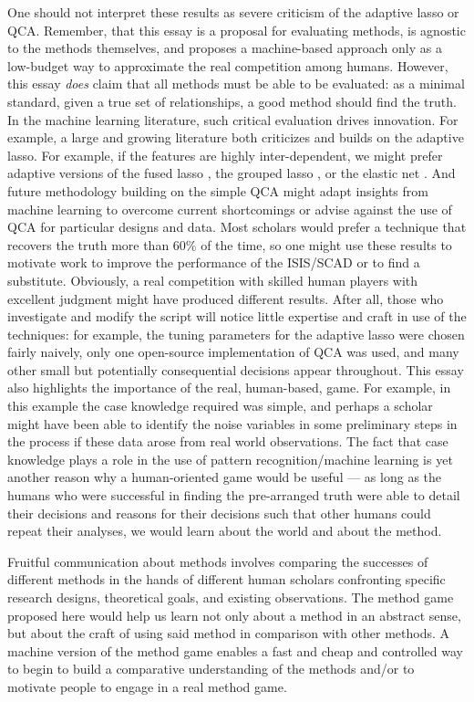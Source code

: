 \documentclass[12pt]{article}
\begin{document}
One should not interpret these results as severe criticism of the adaptive
lasso or QCA. Remember, that this essay is a proposal for evaluating methods,
is agnostic to the methods themselves, and proposes a machine-based approach
only as a low-budget way to approximate the real competition among humans.
However, this essay \emph{does} claim that all methods must be able to be
evaluated: as a minimal standard, given a true set of relationships, a good
method should find the truth. In the machine learning literature, such
critical evaluation drives innovation. For example, a large and growing
literature both criticizes and builds on the adaptive lasso. For example, if
the features are highly inter-dependent, we might prefer adaptive versions of
the fused lasso \citep{rinaldo2009properties}, the grouped lasso
\citep{wang2008note}, or the elastic net \citep{ghosh2011grouped,
  zou2004regression}. And future methodology building on the simple QCA might
adapt insights from machine learning to overcome current shortcomings or
advise against the use of QCA for particular designs and data.  Most scholars
would prefer a technique that recovers the truth more than 60\% of the time,
so one might use these results to motivate work to improve the performance of
the ISIS/SCAD or to find a substitute. Obviously, a real competition with
skilled human players with excellent judgment might have produced different
results.  After all, those who investigate and modify the script will notice
little expertise and craft in use of the techniques: for example, the tuning
parameters for the adaptive lasso were chosen fairly naively, only one
open-source implementation of QCA was used, and many other small but
potentially consequential decisions appear throughout. This essay also
highlights the importance of the real, human-based, game. For example, in this
example the case knowledge required was simple, and perhaps a scholar might
have been able to identify the noise variables in some preliminary steps in
the process if these data arose from real world observations. The fact that
case knowledge plays a role in the use of pattern recognition/machine learning
is yet another reason why a human-oriented game would be useful --- as long as
the humans who were successful in finding the pre-arranged truth were able to
detail their decisions and reasons for their decisions such that other humans
could repeat their analyses, we would learn about the world and about the
method. 

Fruitful communication about methods involves comparing the successes of
different methods in the hands of different human scholars confronting
specific research designs, theoretical goals, and existing observations. The
method game proposed here would help us learn not only about a method in
an abstract sense, but about the craft of using said method in comparison with
other methods. A machine version of the method game enables a fast and cheap
and controlled way to begin to build a comparative understanding of the
methods and/or to motivate people to engage in a real method game.




%

\end{document}
